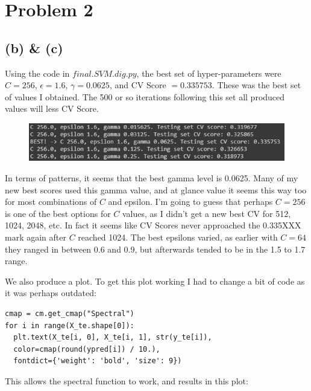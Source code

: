 \documentclass[a4paper]{article}
\begin{document}
\newpage


\section{Problem 2}
\subsection{(b) \& (c)}
Using the code in $final.SVM.dig.py$, the best set of hyper-parameters were $C=256$, $\epsilon = 1.6$, $\gamma = 0.0625$, and CV Score $= 0.335753$. These was the best set of values I obtained. The 500 or so iterations following this set all produced values will less CV Score.


\begin{figure}[h]
  \begin{center}
    \includegraphics[width=150mm,scale=1]{problem2b.png}
  \end{center}
\end{figure}


In terms of patterns, it seems that the best gamma level is 0.0625. Many of my new best scores used this gamma value, and at glance value it seems this way too for most combinations of $C$ and epsilon. I'm going to guess that perhaps $C=256$ is one of the best options for $C$ values, as I didn't get a new best CV for 512, 1024, 2048, etc. In fact it seems like CV Scores never approached the 0.335XXX mark again after $C$ reached 1024. The best epsilons varied, as earlier with $C=64$ they ranged in between 0.6 and 0.9, but afterwards tended to be in the 1.5 to 1.7 range.


We also produce a plot. To get this plot working I had to change a bit of code as it was perhaps outdated:


\begin{lstlisting}[frame=single]
cmap = cm.get_cmap("Spectral")
for i in range(X_te.shape[0]):
  plt.text(X_te[i, 0], X_te[i, 1], str(y_te[i]), 
  color=cmap(round(ypred[i]) / 10.), 
  fontdict={'weight': 'bold', 'size': 9})
\end{lstlisting}


This allows the spectral function to work, and results in this plot:
\end{document}
